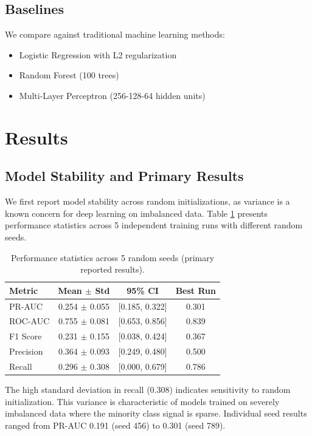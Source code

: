 \documentclass[12pt,a4paper]{article}
\begin{document}
\subsection{Baselines}
We compare against traditional machine learning methods:
\begin{itemize}
    \item Logistic Regression with L2 regularization
    \item Random Forest (100 trees)
    \item Multi-Layer Perceptron (256-128-64 hidden units)
\end{itemize}

\section{Results}

\subsection{Model Stability and Primary Results}
We first report model stability across random initializations, as variance is a known concern for deep learning on imbalanced data. Table \ref{tab:multi-seed} presents performance statistics across 5 independent training runs with different random seeds.

\begin{table}[H]
\centering
\caption{Performance statistics across 5 random seeds (primary reported results).}
\label{tab:multi-seed}
\begin{tabular}{lccc}
\toprule
\textbf{Metric} & \textbf{Mean $\pm$ Std} & \textbf{95\% CI} & \textbf{Best Run} \\
\midrule
PR-AUC & 0.254 $\pm$ 0.055 & [0.185, 0.322] & 0.301 \\
ROC-AUC & 0.755 $\pm$ 0.081 & [0.653, 0.856] & 0.839 \\
F1 Score & 0.231 $\pm$ 0.155 & [0.038, 0.424] & 0.367 \\
Precision & 0.364 $\pm$ 0.093 & [0.249, 0.480] & 0.500 \\
Recall & 0.296 $\pm$ 0.308 & [0.000, 0.679] & 0.786 \\
\bottomrule
\end{tabular}
\end{table}

The high standard deviation in recall (0.308) indicates sensitivity to random initialization. This variance is characteristic of models trained on severely imbalanced data where the minority class signal is sparse. Individual seed results ranged from PR-AUC 0.191 (seed 456) to 0.301 (seed 789).
\end{document}
